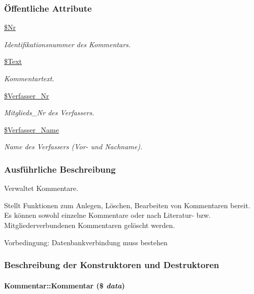 \subsubsection*{\"{O}ffentliche Attribute}
\begin{CompactItemize}
\item 
\hyperlink{classKommentar_1b0a3cfcb9fc7075f985cc8067ab1982}{\$Nr}
\begin{CompactList}\small\item\em Identifikationsnummer des Kommentars. \item\end{CompactList}\item 
\hyperlink{classKommentar_c9a481413d6ba0c000719ad514bad4b5}{\$Text}
\begin{CompactList}\small\item\em Kommentartext. \item\end{CompactList}\item 
\hyperlink{classKommentar_c92b002e40690ee052fec446ff2a0ef6}{\$Verfasser\_\-Nr}
\begin{CompactList}\small\item\em Mitglieds\_\-Nr des Verfassers. \item\end{CompactList}\item 
\hyperlink{classKommentar_84f0fc10295968adde28169f8df018d9}{\$Verfasser\_\-Name}
\begin{CompactList}\small\item\em Name des Verfassers (Vor- und Nachname). \item\end{CompactList}\end{CompactItemize}


\subsubsection{Ausf\"{u}hrliche Beschreibung}
Verwaltet Kommentare. 

Stellt Funktionen zum Anlegen, Löschen, Bearbeiten von Kommentaren bereit. Es können sowohl einzelne Kommentare oder nach Literatur- bzw. Mitgliederverbundenen Kommentaren gelöscht werden. \begin{Desc}
\item[Vorbedingung:]Datenbankverbindung muss bestehen \end{Desc}




\subsubsection{Beschreibung der Konstruktoren und Destruktoren}
\hypertarget{classKommentar_ea774e2108c754890c602dfdd53d64e1}{
\paragraph[Kommentar]{\setlength{\rightskip}{0pt plus 5cm}Kommentar::Kommentar (\$ {\em data})}\hfill}
\label{classKommentar_ea774e2108c754890c602dfdd53d64e1}


